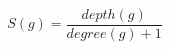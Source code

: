 \documentclass[conference]{IEEEtran}
\begin{document}
\begin{equation}
S(g) = \frac{depth(g)}{degree(g)+1}
\label{eqn:specificity}
\end{equation}

%
%



%
%
\end{document}
